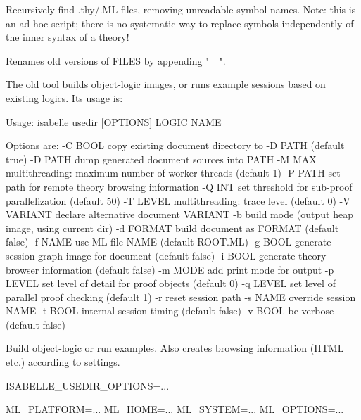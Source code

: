 \begin{isabellebody}
\begin{isamarkuptext}
\begin{ttbox}
  Recursively find .thy/.ML files, removing unreadable symbol names.
  Note: this is an ad-hoc script; there is no systematic way to replace
  symbols independently of the inner syntax of a theory!

  Renames old versions of FILES by appending "~~".
\end{ttbox}%
\end{isamarkuptext}%
\isamarkuptrue%
%
\isamarkuptrue%
%
\begin{isamarkuptext}%
The old \hypertarget{tool.usedir}{\hyperlink{tool.usedir}{\mbox{}}} tool builds object-logic images, or
  runs example sessions based on existing logics. Its usage is:
\begin{ttbox}
Usage: isabelle usedir [OPTIONS] LOGIC NAME

  Options are:
    -C BOOL      copy existing document directory to -D PATH (default true)
    -D PATH      dump generated document sources into PATH
    -M MAX       multithreading: maximum number of worker threads (default 1)
    -P PATH      set path for remote theory browsing information
    -Q INT       set threshold for sub-proof parallelization (default 50)
    -T LEVEL     multithreading: trace level (default 0)
    -V VARIANT   declare alternative document VARIANT
    -b           build mode (output heap image, using current dir)
    -d FORMAT    build document as FORMAT (default false)
    -f NAME      use ML file NAME (default ROOT.ML)
    -g BOOL      generate session graph image for document (default false)
    -i BOOL      generate theory browser information (default false)
    -m MODE      add print mode for output
    -p LEVEL     set level of detail for proof objects (default 0)
    -q LEVEL     set level of parallel proof checking (default 1)
    -r           reset session path
    -s NAME      override session NAME
    -t BOOL      internal session timing (default false)
    -v BOOL      be verbose (default false)

  Build object-logic or run examples. Also creates browsing
  information (HTML etc.) according to settings.

  ISABELLE_USEDIR_OPTIONS=...

  ML_PLATFORM=...
  ML_HOME=...
  ML_SYSTEM=...
  ML_OPTIONS=...
\end{ttbox}


\end{isamarkuptext}
\end{isabellebody}
